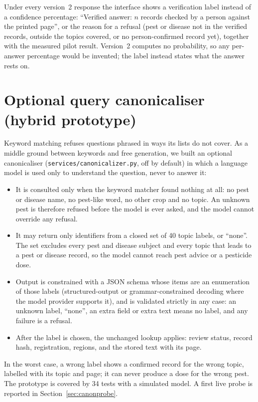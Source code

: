 Under every version~2 response the interface shows a verification label instead of a
confidence percentage: ``Verified answer: $n$ records checked by a person against the printed
page'', or the reason for a refusal (pest or disease not in the verified records, outside
the topics covered, or no person-confirmed record yet), together with the measured pilot
result. Version~2 computes no probability, so any per-answer percentage would be invented;
the label instead states what the answer rests on.

\section{Optional query canonicaliser (hybrid prototype)}
\label{sec:canonicalizer}
Keyword matching refuses questions phrased in ways its lists do not cover. As a middle
ground between keywords and free generation, we built an optional canonicaliser
(\texttt{services/canonicalizer.py}, off by default) in which a language model is used only
to understand the question, never to answer it:
\begin{itemize}
  \item It is consulted only when the keyword matcher found nothing at all: no pest or
    disease name, no pest-like word, no other crop and no topic. An unknown pest is therefore
    refused before the model is ever asked, and the model cannot override any refusal.
  \item It may return only identifiers from a closed set of 40 topic labels, or ``none''.
    The set excludes every pest and disease subject and every topic that leads to a pest or
    disease record, so the model cannot reach pest advice or a pesticide dose.
  \item Output is constrained with a JSON schema whose items are an enumeration of those
    labels (structured-output or grammar-constrained decoding where the model provider
    supports it), and is validated strictly in any case: an unknown label, ``none'', an extra
    field or extra text means no label, and any failure is a refusal.
  \item After the label is chosen, the unchanged lookup applies: review status, record hash,
    registration, regions, and the stored text with its page.
\end{itemize}
In the worst case, a wrong label shows a confirmed record for the wrong topic, labelled with
its topic and page; it can never produce a dose for the wrong pest. The prototype is covered
by 34 tests with a simulated model. A first live probe is reported in
Section~\ref{sec:canonprobe}.

